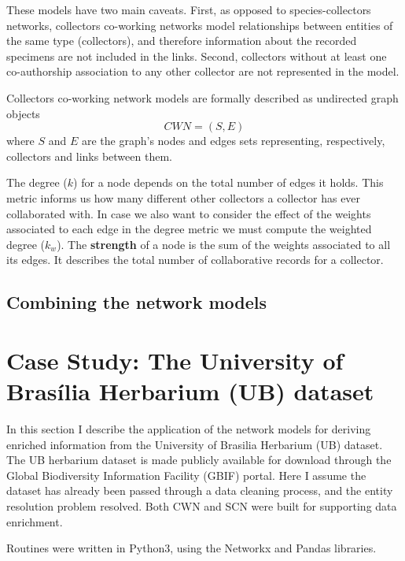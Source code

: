 \documentclass[a4paper]{article}
\begin{document}
These models have two main caveats. 
First, as opposed to species-collectors networks, collectors co-working networks model relationships between entities of the same type (collectors), and therefore information about the recorded specimens are not included in the links.
Second, collectors without at least one co-authorship association to any other collector are not represented in the model.

Collectors co-working network models are formally described as undirected graph objects
$$CWN = (S,E)$$
where $S$ and $E$ are the graph's nodes and edges sets representing, respectively, collectors and links between them. 

The degree ($k$) for a node depends on the total number of edges it holds. 
This metric informs us how many different other collectors a collector has ever collaborated with.
In case we also want to consider the effect of the weights associated to each edge in the degree metric we must compute the weighted degree ($k_w$).
The \textbf{strength} of a node is the sum of the weights associated to all its edges. It describes the total number of collaborative records for a collector.





\subsection{Combining the network models}




\section{Case Study: The University of Brasília Herbarium (UB) dataset}

In this section I describe the application of the network models for deriving enriched information from the University of Brasilia Herbarium (UB) dataset.
The UB herbarium dataset is made publicly available for download through the Global Biodiversity Information Facility (GBIF) portal.
Here I assume the dataset has already been passed through a data cleaning process, and the entity resolution problem resolved.
Both CWN and SCN were built for supporting data enrichment.

Routines were written in Python3, using the Networkx and Pandas libraries.
\end{document}
